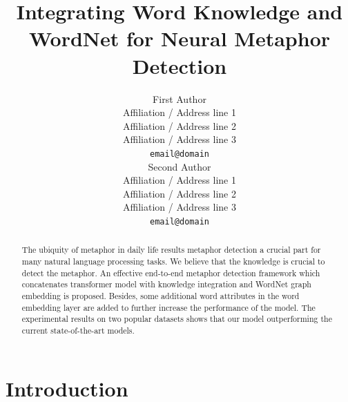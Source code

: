 \documentclass[11pt,a4paper]{article}
\title{Integrating Word Knowledge and WordNet for Neural Metaphor Detection}
\author{First Author \\
  Affiliation / Address line 1 \\
  Affiliation / Address line 2 \\
  Affiliation / Address line 3 \\
  \texttt{email@domain} \\\And
  Second Author \\
  Affiliation / Address line 1 \\
  Affiliation / Address line 2 \\
  Affiliation / Address line 3 \\
  \texttt{email@domain} \\}
\date{}
\begin{document}
\maketitle
\begin{abstract}
   The ubiquity of metaphor in daily life results metaphor detection a crucial part for many natural language processing tasks. We believe that the knowledge is crucial to detect the metaphor. An effective end-to-end metaphor detection framework which concatenates transformer model with knowledge integration and WordNet graph embedding is proposed. Besides, some additional word attributes in the word embedding layer are added to further increase the performance of the model. The experimental results on two popular datasets shows that our model outperforming the current state-of-the-art models.

\end{abstract}



\section{Introduction}
\end{document}
